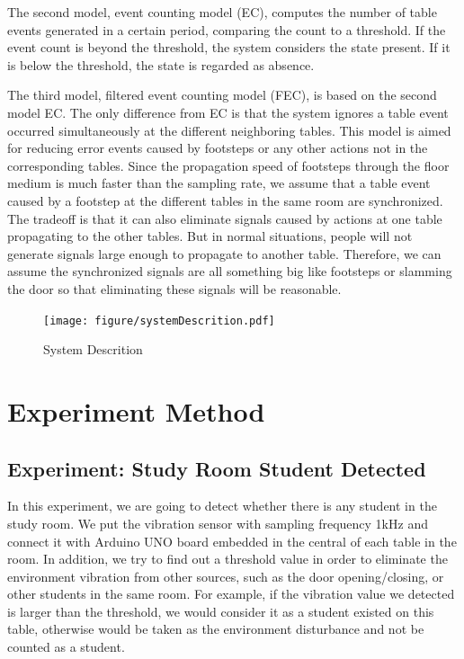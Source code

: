 \documentclass{sig-alternate-ipsn13}
\begin{document}
The second model, event counting model (EC), computes the number of table events generated in a certain period, comparing the count to a threshold. If the event count is beyond the threshold, the system considers the state present. If it is below the threshold, the state is regarded as absence.

The third model, filtered event counting model (FEC), is based on the second model EC. The only difference from EC is that the system ignores a table event occurred simultaneously at the different neighboring tables. This model is aimed for reducing error events caused by footsteps or any other actions not in the corresponding tables. Since the propagation speed of footsteps through the floor medium is much faster than the sampling rate, we assume that a table event caused by a footstep at the different tables in the same room are synchronized. The tradeoff is that it can also eliminate signals caused by actions at one table propagating to the other tables. But in normal situations, people will not generate signals large enough to propagate to another table. Therefore, we can assume the synchronized signals are all something big like footsteps or slamming the door so that eliminating these signals will be reasonable. 


\begin{figure}
  \centering
  \texttt{[image: figure/systemDescrition.pdf]}
  \caption{System Descrition}
  \label{fig:SystemDescrition}
\end{figure}



\section{Experiment Method}
\subsection{Experiment: Study Room Student Detected}

In this experiment, we are going to detect whether there is any student in the study room. We put the vibration sensor with sampling frequency 1kHz and connect it with Arduino UNO board embedded in the central of each table in the room. In addition, we try to find out a threshold value in order to eliminate the environment vibration from other sources, such as the door opening/closing, or other students in the same room. For example, if the vibration value we detected is larger than the threshold, we would consider it as a student existed on this table, otherwise would be taken as the environment disturbance and not be counted as a student. 
\end{document}
